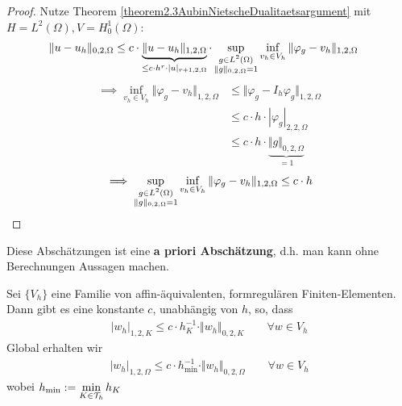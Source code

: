 \begin{proof}
	Nutze Theorem \ref{theorem2.3AubinNietscheDualitaetsargument} mit $H=L^2(\Omega),V=H_0^1(\Omega)$:
	\begin{align*}
		\Vert u-u_h\Vert_{0,2,\Omega}
		&\leq c\cdot\underbrace{\Vert u-u_h\Vert_{1,2,\Omega}}_{\leq c \cdot h^r\cdot|u|_{r+1,2,\Omega}}\cdot\sup\limits_{\begin{subarray}{c}g\in L^2(\Omega)\\\Vert g\Vert_{0,2,\Omega}=1\end{subarray}}\inf\limits_{v_h\in V_h}\Vert\varphi_g-v_h\Vert_{1,2,\Omega}
	\end{align*}
	\begin{align*}
		\implies
		\inf\limits_{v_h\in V_h}\Vert\varphi_g-v_h\Vert_{1,2,\Omega}
		&\leq\big\Vert\varphi_g -I_h\varphi_g\big\Vert_{1,2,\Omega}\\
		&\leq c\cdot h\cdot|\varphi_g|_{2,2,\Omega}\\
		&\leq c\cdot h\cdot\underbrace{\Vert g\Vert_{0,2,\Omega}}_{=1}
	\end{align*}
	\begin{align*}
		\implies
		\sup\limits_{\begin{subarray}{c}g\in L^2(\Omega)\\\Vert g\Vert_{0,2,\Omega}=1\end{subarray}}\inf\limits_{v_h\in V_h}\Vert\varphi_g-v_h\Vert_{1,2,\Omega}
		\leq c\cdot h
	\end{align*}
\end{proof}

Diese Abschätzungen ist eine \textbf{a priori Abschätzung}, d.h. man kann ohne Berechnungen Aussagen machen.

\begin{lemma}\label{lemma4.19InverseAbschaetzung}\enter
Sei $\lbrace V_h\rbrace$ eine Familie von affin-äquivalenten, formregulären Finiten-Elementen.\\
Dann gibt es eine konstante $c$, unabhängig von $h$, so, dass
	\begin{align*}
		|w_h|_{1,2,K}\leq c\cdot h^{-1}_K\cdot\Vert w_h\Vert_{0,2,K}\qquad\forall w\in V_h
	\end{align*}
	Global erhalten wir
	\begin{align*}
		|w_h|_{1,2,\Omega}\leq c\cdot h^{-1}_{\min}\cdot\Vert w_h\Vert_{0,2,\Omega}\qquad\forall w\in V_h
	\end{align*}
	wobei $h_{\min}:=\min\limits_{K\in\mathcal{T}_h} h_K$
\end{lemma}

